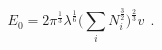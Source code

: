 \begin{equation}
E_0=2\pi^{\frac{1}{3}}\lambda^{\frac{1}{6}}
	\biggl(\sum_iN_i^{\frac{3}{2}}\biggr)^{\frac{2}{3}}v~~.
\label{E00.eqn2}
\end{equation}

